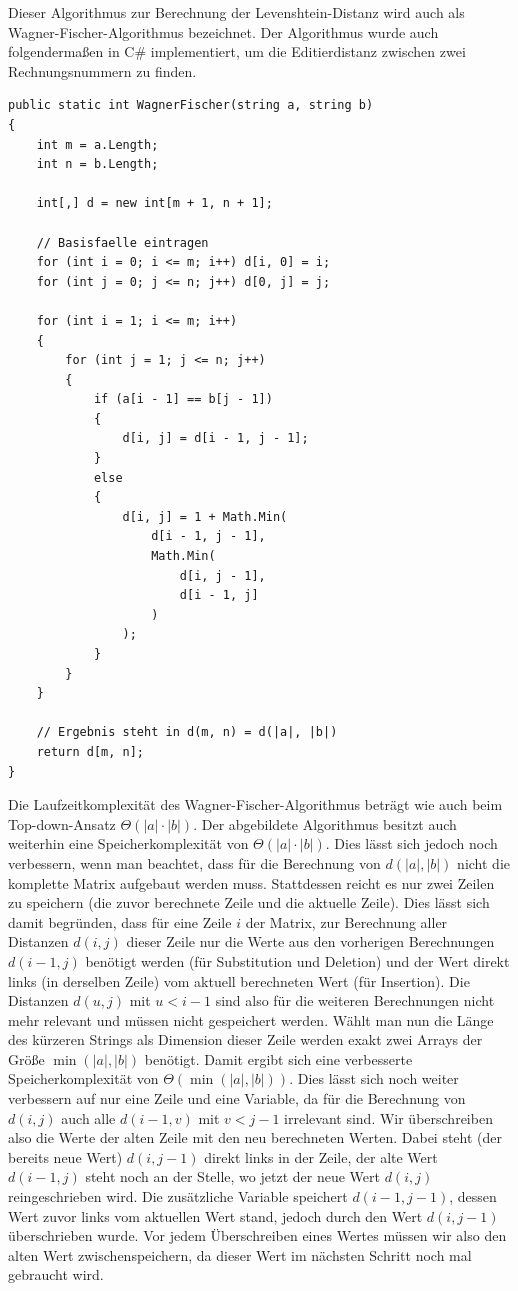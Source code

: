 \documentclass{whswinvcbook}
\begin{document}
Dieser Algorithmus zur Berechnung der Levenshtein-Distanz wird auch als Wagner-Fischer-Algorithmus bezeichnet. Der Algorithmus wurde auch folgendermaßen in C\# implementiert, um die Editierdistanz zwischen zwei Rechnungsnummern zu finden.
\begin{lstlisting}[caption=Wagner-Fischer-Algorithmus, label=lst:wagner_fischer]
public static int WagnerFischer(string a, string b)
{
    int m = a.Length;
    int n = b.Length;

    int[,] d = new int[m + 1, n + 1];

    // Basisfaelle eintragen
    for (int i = 0; i <= m; i++) d[i, 0] = i;
    for (int j = 0; j <= n; j++) d[0, j] = j;

    for (int i = 1; i <= m; i++)
    {
        for (int j = 1; j <= n; j++)
        {
            if (a[i - 1] == b[j - 1])
            {
                d[i, j] = d[i - 1, j - 1];
            }
            else
            {
                d[i, j] = 1 + Math.Min(
                    d[i - 1, j - 1],
                    Math.Min(
                        d[i, j - 1],
                        d[i - 1, j]
                    )
                );
            }
        }
    }

    // Ergebnis steht in d(m, n) = d(|a|, |b|)
    return d[m, n];
}
\end{lstlisting}
Die Laufzeitkomplexität des Wagner-Fischer-Algorithmus beträgt wie auch beim Top-down-Ansatz $\Theta(|a|\cdot|b|)$. Der abgebildete Algorithmus besitzt auch weiterhin eine Speicherkomplexität von $\Theta(|a|\cdot|b|)$. Dies lässt sich jedoch noch verbessern, wenn man beachtet, dass für die Berechnung von $d(|a|,|b|)$ nicht die komplette Matrix aufgebaut werden muss. Stattdessen reicht es nur zwei Zeilen zu speichern (die zuvor berechnete Zeile und die aktuelle Zeile). Dies lässt sich damit begründen, dass für eine Zeile $i$ der Matrix, zur Berechnung aller Distanzen $d(i,j)$ dieser Zeile nur die Werte aus den vorherigen Berechnungen $d(i-1,j)$ benötigt werden (für Substitution und Deletion) und der Wert direkt links (in derselben Zeile) vom aktuell berechneten Wert (für Insertion). Die Distanzen $d(u,j)$ mit $u<i-1$ sind also für die weiteren Berechnungen nicht mehr relevant und müssen nicht gespeichert werden. Wählt man nun die Länge des kürzeren Strings als Dimension dieser Zeile werden exakt zwei Arrays der Größe $\min(|a|,|b|)$ benötigt. Damit ergibt sich eine verbesserte Speicherkomplexität von $\Theta(\min(|a|,|b|))$. Dies lässt sich noch weiter verbessern auf nur eine Zeile und eine Variable, da für die Berechnung von $d(i,j)$ auch alle $d(i-1,v)$ mit $v<j-1$ irrelevant sind. Wir überschreiben also die Werte der alten Zeile mit den neu berechneten Werten. Dabei steht (der bereits neue Wert) $d(i,j-1)$ direkt links in der Zeile, der alte Wert $d(i-1,j)$ steht noch an der Stelle, wo jetzt der neue Wert $d(i,j)$ reingeschrieben wird. Die zusätzliche Variable speichert $d(i-1,j-1)$, dessen Wert zuvor links vom aktuellen Wert stand, jedoch durch den Wert $d(i,j-1)$ überschrieben wurde. Vor jedem Überschreiben eines Wertes müssen wir also den alten Wert zwischenspeichern, da dieser Wert im nächsten Schritt noch mal gebraucht wird.
\end{document}

